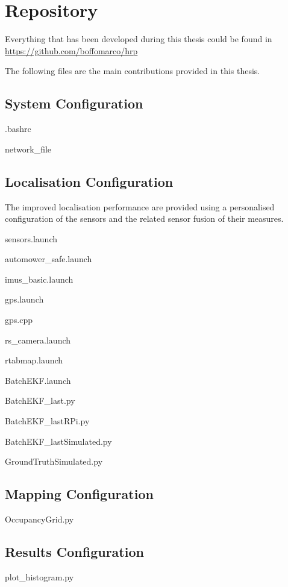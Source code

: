 \chapter{Repository}
\noindent
Everything that has been developed during this thesis could be found in \url{https://github.com/boffomarco/hrp}

The following files are the main contributions provided in this thesis.

\section{System Configuration}
\noindent


.bashrc

network\_file 

\section{Localisation Configuration}
\noindent The improved localisation performance are provided using a personalised configuration of the sensors and the related sensor fusion of their measures.

sensors.launch

automower\_safe.launch

imus\_basic.launch

gps.launch

gps.cpp

rs\_camera.launch

rtabmap.launch

BatchEKF.launch

BatchEKF\_last.py

BatchEKF\_lastRPi.py

BatchEKF\_lastSimulated.py

GroundTruthSimulated.py

\section{Mapping Configuration}
\noindent

OccupancyGrid.py

\section{Results Configuration}
\noindent

plot\_histogram.py

